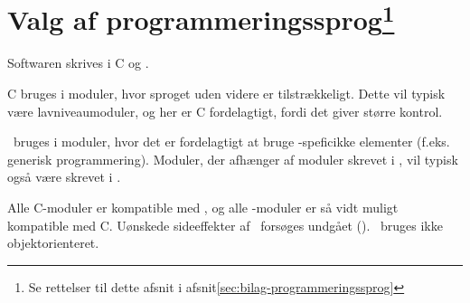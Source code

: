 
\section[Valg af programmeringssprog]{Valg af
  programmeringssprog\footnote{Se rettelser til dette afsnit i afsnit\vref{sec:bilag-programmeringssprog}}}

Softwaren skrives i C og \Cpp.

C bruges i moduler, hvor sproget uden videre er tilstrækkeligt. Dette
vil typisk være lavniveaumoduler, og her er C fordelagtigt, fordi det
giver større kontrol.

\Cpp\ bruges i moduler, hvor det er fordelagtigt at bruge
\Cpp-speficikke elementer (f.eks. generisk programmering). Moduler, der afhænger af moduler skrevet i \Cpp, vil
typisk også være skrevet i \Cpp.

Alle C-moduler er kompatible med \Cpp, og alle \Cpp-moduler er så vidt
muligt kompatible med C. Uønskede sideeffekter af \Cpp\ forsøges
undgået (). \Cpp\ bruges ikke objektorienteret.



